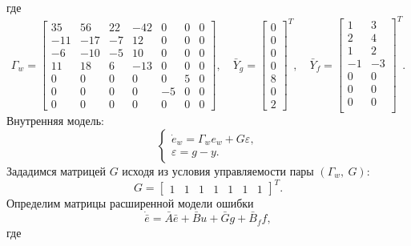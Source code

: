 где
\begin{equation*}
    \Gamma_w=\begin{bmatrix}
        35& 56& 22& -42 & 0 & 0 & 0\\
        -11& -17& -7& 12 & 0 & 0 & 0\\
        -6& -10& -5& 10 & 0 & 0 & 0\\
        11 &18& 6& -13 & 0 & 0 & 0\\
        0 & 0 & 0 & 0 & 0 & 5 & 0 \\
        0 & 0 & 0 & 0 & -5& 0 & 0 \\
        0 & 0 & 0 & 0 & 0 & 0 & 0
    \end{bmatrix},\quad
    \bar Y_g=\begin{bmatrix}
        0\\0\\0\\0\\8 \\ 0 \\ 2
    \end{bmatrix}^T,\quad
    \bar Y_f=\begin{bmatrix}
        1&3\\2&4\\1&2\\-1&-3\\0&0\\0&0\\0&0\\
    \end{bmatrix}^T.
\end{equation*}
Внутренняя модель:
\begin{equation*}   
    \begin{cases}
        \dot e_w=\Gamma_w e_w+G\varepsilon,\\
        \varepsilon=g-y.
    \end{cases}
\end{equation*}
Зададимся матрицей $G$ исходя из условия управляемости пары $(\Gamma_w,\ G)$:
\begin{equation*}
    G=\begin{bmatrix}
        1&1&1&1&1&1&1
    \end{bmatrix}^T.
\end{equation*}
Определим матрицы расширенной модели ошибки
\begin{equation*}
    \dot{\bar e}=\bar A\bar e+\bar Bu+\bar Gg+\bar B_ff,
\end{equation*}
где
